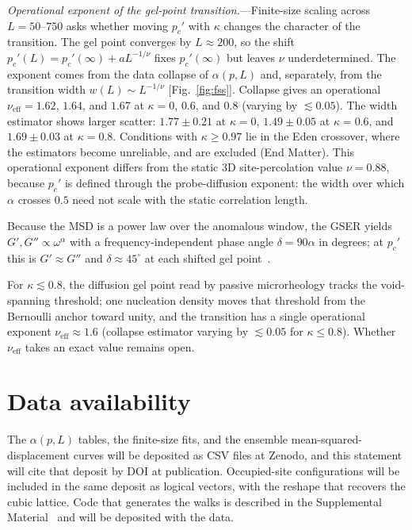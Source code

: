 \documentclass[aps,prl,twocolumn,superscriptaddress,floatfix,nofootinbib,longbibliography]{revtex4-2}
\newcommand{\pcp}{p_c'}
\newcommand{\kap}{\kappa}
\newcommand{\nueff}{\nu_{\mathrm{eff}}}
\begin{document}
\emph{Operational exponent of the gel-point transition.}---Finite-size scaling across $L=50$--$750$ asks whether moving $\pcp$ with $\kap$ changes the character of the transition. The gel point converges by $L\approx200$, so the shift $\pcp(L)=\pcp(\infty)+aL^{-1/\nu}$ fixes $\pcp(\infty)$ but leaves $\nu$ underdetermined. The exponent comes from the data collapse of $\alpha(p,L)$ and, separately, from the transition width $w(L)\sim L^{-1/\nu}$ [Fig.~\ref{fig:fss}]. Collapse gives an operational $\nueff=1.62$, $1.64$, and $1.67$ at $\kap=0$, $0.6$, and $0.8$ (varying by $\lesssim0.05$). The width estimator shows larger scatter: $1.77\pm0.21$ at $\kap=0$, $1.49\pm0.05$ at $\kap=0.6$, and $1.69\pm0.03$ at $\kap=0.8$. Conditions with $\kap\ge0.97$ lie in the Eden crossover, where the estimators become unreliable, and are excluded (End Matter). This operational exponent differs from the static 3D site-percolation value $\nu=0.88$, because $\pcp$ is defined through the probe-diffusion exponent: the width over which $\alpha$ crosses $0.5$ need not scale with the static correlation length.

Because the MSD is a power law over the anomalous window, the GSER yields $G',G''\propto\omega^{\alpha}$ with a frequency-independent phase angle $\delta=90\alpha$ in degrees; at $\pcp$ this is $G'\approx G''$ and $\delta\approx45^{\circ}$ at each shifted gel point~\cite{SM}.

For $\kap\lesssim0.8$, the diffusion gel point read by passive microrheology tracks the void-spanning threshold; one nucleation density moves that threshold from the Bernoulli anchor toward unity, and the transition has a single operational exponent $\nueff\approx1.6$ (collapse estimator varying by $\lesssim0.05$ for $\kap\le0.8$). Whether $\nueff$ takes an exact value remains open.

\begin{acknowledgments}
\end{acknowledgments}

\section*{Data availability}
The $\alpha(p,L)$ tables, the finite-size fits, and the ensemble mean-squared-displacement curves will be deposited as CSV files at Zenodo, and this statement will cite that deposit by DOI at publication. Occupied-site configurations will be included in the same deposit as logical vectors, with the reshape that recovers the cubic lattice. Code that generates the walks is described in the Supplemental Material~\cite{SM} and will be deposited with the data.
\end{document}
